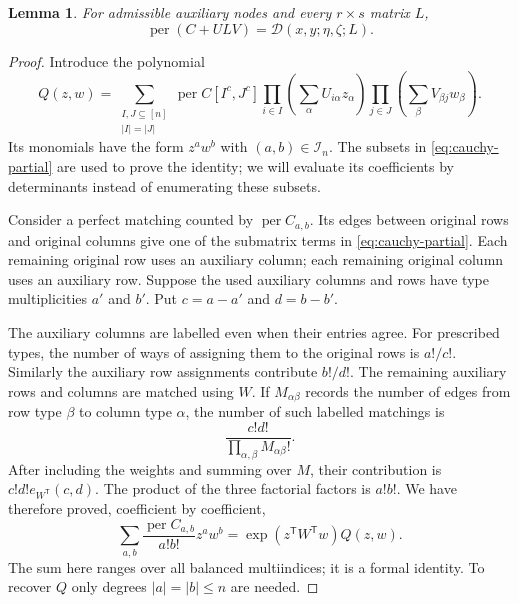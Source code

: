 \documentclass[11pt,reqno]{amsart}
\newtheorem{lemma}[theorem]{Lemma}
\theoremstyle{remark}
\numberwithin{equation}{section}
\newcommand{\per}{\operatorname{per}}
\newcommand{\calI}{\mathcal I}
\newcommand{\calD}{\mathcal D}
\begin{document}
\begin{lemma}\label{lem:cauchy-border}
For admissible auxiliary nodes and every $r\times s$ matrix $L$,
\begin{equation}\label{eq:cauchy-resolvent}
 \per(C+ULV)=\calD(x,y;\eta,\zeta;L).
\end{equation}
\end{lemma}

\begin{proof}
Introduce the polynomial
\begin{equation}\label{eq:cauchy-partial}
 Q(z,w)=\sum_{\substack{I,J\subseteq[n]\\|I|=|J|}}
 \per C[I^c,J^c]
 \prod_{i\in I}\left(\sum_\alpha U_{i\alpha}z_\alpha\right)
 \prod_{j\in J}\left(\sum_\beta V_{\beta j}w_\beta\right).
\end{equation}
Its monomials have the form $z^a w^b$ with $(a,b)\in\calI_n$.
The subsets in \eqref{eq:cauchy-partial} are used to prove the identity;
we will evaluate its coefficients by determinants instead of
enumerating these subsets.

Consider a perfect matching counted by $\per C_{a,b}$. Its edges
between original rows and original columns give one of the
submatrix terms in \eqref{eq:cauchy-partial}. Each remaining original row
uses an auxiliary column; each remaining original column uses an
auxiliary row. Suppose the used auxiliary columns and rows have
type multiplicities $a'$ and $b'$.
Put $c=a-a'$ and $d=b-b'$.

The auxiliary columns are labelled even when their entries agree.
For prescribed types, the number of ways of assigning them to
the original rows is $a!/c!$. Similarly the auxiliary row
assignments contribute $b!/d!$. The remaining auxiliary rows
and columns are matched using $W$. If $M_{\alpha\beta}$ records
the number of edges from row type $\beta$ to column type
$\alpha$, the number of such labelled matchings is
\[
 \frac{c!d!}{\prod_{\alpha,\beta}M_{\alpha\beta}!}.
\]
After including the weights and summing over $M$, their
contribution is $c!d!e_{W^{\mathsf T}}(c,d)$.
The product of the three factorial factors is $a!b!$.
We have therefore proved, coefficient by coefficient,
\begin{equation}\label{eq:cauchy-blockgenerating}
 \sum_{a,b}\frac{\per C_{a,b}}{a!b!}z^a w^b
 =\exp(z^{\mathsf T}W^{\mathsf T}w)Q(z,w).
\end{equation}
The sum here ranges over all balanced multiindices; it is a formal
identity. To recover $Q$ only degrees $|a|=|b|\leq n$ are needed.


\end{proof}
\end{document}
